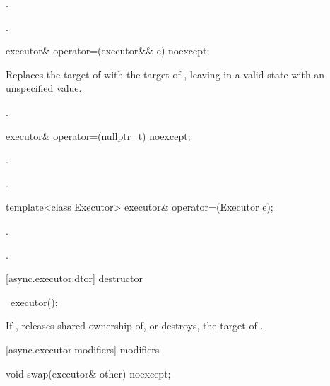 \begin{itemdescr}
\pnum
\effects {}.

\pnum
\returns {}.
\end{itemdescr}

\begin{itemdecl}
executor& operator=(executor&& e) noexcept;
\end{itemdecl}

\begin{itemdescr}
\pnum
\effects Replaces the target of  with the target of , leaving  in a valid state with an unspecified value.

\pnum
\returns {}.
\end{itemdescr}

\begin{itemdecl}
executor& operator=(nullptr_t) noexcept;
\end{itemdecl}

\begin{itemdescr}
\pnum
\effects {}.

\pnum
\returns {}.
\end{itemdescr}

\begin{itemdecl}
template<class Executor> executor& operator=(Executor e);
\end{itemdecl}

\begin{itemdescr}
\pnum
\effects {}.

\pnum
\returns {}.
\end{itemdescr}



[async.executor.dtor]{ destructor}

\begin{itemdecl}
~executor();
\end{itemdecl}

\begin{itemdescr}
\pnum
\effects If , releases shared ownership of, or destroys, the target of .
\end{itemdescr}



[async.executor.modifiers]{ modifiers}

\begin{itemdecl}
void swap(executor& other) noexcept;
\end{itemdecl}

